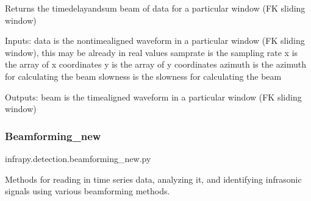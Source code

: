 \documentclass[letterpaper,10pt,english]{sphinxmanual}
\begin{document}
\begin{fulllineitems}
\label{\detokenize{infrapy.detection:infrapy.detection.beamforming.tdelayT}}
Returns the time\sphinxhyphen{}delay\sphinxhyphen{}and\sphinxhyphen{}sum beam of data for a particular window (FK sliding window)

Inputs:
\sphinxhyphen{} data is the non\sphinxhyphen{}time\sphinxhyphen{}aligned waveform in a particular window (FK sliding window), this may be already in real values
\sphinxhyphen{} samprate is the sampling rate
\sphinxhyphen{} x is the array of x coordinates
\sphinxhyphen{} y is the array of y coordinates
\sphinxhyphen{} azimuth is the azimuth for calculating the beam
\sphinxhyphen{} slowness is the slowness for calculating the beam

Outputs:
\sphinxhyphen{} beam is the time\sphinxhyphen{}aligned waveform in a particular window (FK sliding window)

\end{fulllineitems}


\begin{fulllineitems}
\label{\detokenize{infrapy.detection:infrapy.detection.beamforming.xcorr_beam}}
\end{fulllineitems}



\subsubsection{Beamforming\_new}
\label{\detokenize{infrapy.detection:module-infrapy.detection.beamforming_new}}\label{\detokenize{infrapy.detection:beamforming-new}}
infrapy.detection.beamforming\_new.py

Methods for reading in time series data, analyzing
it, and identifying infrasonic signals using various
beamforming methods.
\end{document}
